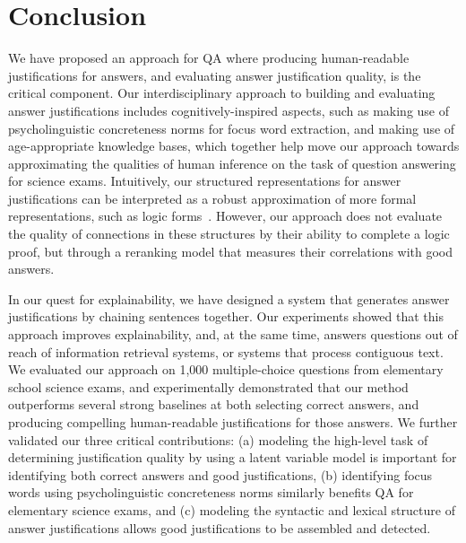 \section{Conclusion}
\label{sec:conclusion}

We have proposed an approach for QA where producing human-readable justifications for answers, and evaluating answer justification quality, is the critical component.
Our interdisciplinary approach to building and evaluating answer justifications includes cognitively-inspired aspects, such as making use of psycholinguistic concreteness norms for focus word extraction, and making use of age-appropriate knowledge bases, which together help move our approach towards approximating the qualities of human inference on the task of question answering for science exams. Intuitively, our structured representations for answer justifications can be interpreted as a robust approximation of more formal representations, such as logic forms~\cite{moldovan2001logic}. However, our approach does not evaluate the quality of connections in these structures by their ability to complete a logic proof, but through a reranking model that measures their correlations with good answers.

In our quest for explainability, we have designed a system that generates answer justifications by chaining sentences together. Our experiments showed that this approach improves explainability, and, at the same time, answers questions out of reach of information retrieval systems, or systems that process contiguous text.  
We evaluated our approach on 1,000 multiple-choice questions from elementary school science exams, and experimentally demonstrated that our method outperforms several strong baselines at both selecting correct answers, and producing compelling human-readable justifications for those answers.  We further validated our three critical contributions: (a) modeling the high-level task of determining justification quality by using a latent variable model is important for identifying both correct answers and good justifications, (b) identifying focus words using psycholinguistic concreteness norms similarly benefits QA for elementary science exams, and (c) modeling the syntactic and lexical structure of answer justifications allows good justifications to be assembled and detected. 

